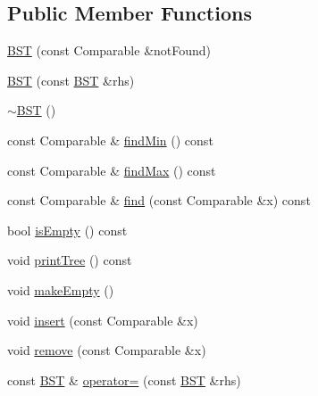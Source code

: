 \subsection*{Public Member Functions}
\begin{DoxyCompactItemize}
\item 
\hyperlink{classBST_a3185a79cf472271f122a97d0f59022d1}{B\+ST} (const Comparable \&not\+Found)
\item 
\hyperlink{classBST_a163232cc6ffcbd1a51707efcc3fa36ca}{B\+ST} (const \hyperlink{classBST}{B\+ST} \&rhs)
\item 
\hyperlink{classBST_abf3125f968641c8726101c5dd18f36be}{$\sim$\+B\+ST} ()
\item 
const Comparable \& \hyperlink{classBST_aa52491ff35aec517961937a17a9fa493}{find\+Min} () const
\item 
const Comparable \& \hyperlink{classBST_a03485f3b0b150f1e69a12c28d26d8092}{find\+Max} () const
\item 
const Comparable \& \hyperlink{classBST_aaf4eb6869f68db0069534f7b2dfbe53b}{find} (const Comparable \&x) const
\item 
bool \hyperlink{classBST_a10fd737b2be62437023407fdc123f728}{is\+Empty} () const
\item 
void \hyperlink{classBST_a91e830925c48040d4c4dbb7d971c3bfe}{print\+Tree} () const
\item 
void \hyperlink{classBST_a050d829503a88714c4ad0773cf6d3af6}{make\+Empty} ()
\item 
void \hyperlink{classBST_a2b117df6521c7d61dac75ff2c938bae7}{insert} (const Comparable \&x)
\item 
void \hyperlink{classBST_a6f01a0b44daf82a42022b6eb4c0df7a2}{remove} (const Comparable \&x)
\item 
const \hyperlink{classBST}{B\+ST} \& \hyperlink{classBST_aa80c39f454c89d4a202be3d1445823f3}{operator=} (const \hyperlink{classBST}{B\+ST} \&rhs)
\end{DoxyCompactItemize}
